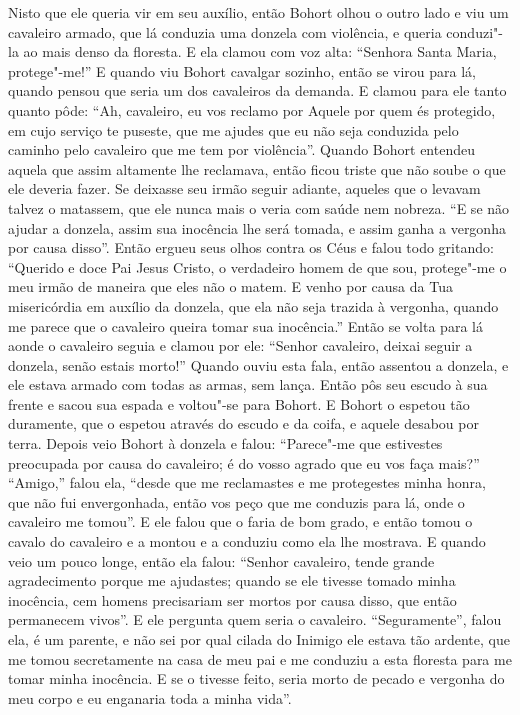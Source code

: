 Nisto que ele queria vir em seu auxílio, então Bohort olhou o outro lado e viu
um cavaleiro armado, que lá conduzia uma donzela com violência, e queria
conduzi"-la ao mais denso da floresta. E ela clamou com voz alta: “Senhora Santa
Maria, protege"-me!” E quando viu Bohort cavalgar sozinho, então se virou para
lá, quando pensou que seria um dos cavaleiros da demanda. E clamou para ele
tanto quanto pôde: “Ah, cavaleiro, eu vos reclamo por Aquele por quem és
protegido, em cujo serviço te puseste, que me ajudes que eu não seja conduzida
pelo caminho pelo cavaleiro que me tem por violência”. Quando Bohort entendeu
aquela que assim altamente lhe reclamava, então ficou triste que não soube o
que ele deveria fazer. Se deixasse seu irmão seguir adiante, aqueles que o
levavam talvez o matassem, que ele nunca mais o veria com saúde nem nobreza. “E
se não ajudar a donzela, assim sua inocência lhe será tomada, e assim ganha a
vergonha por causa disso”. Então ergueu seus olhos contra os Céus e falou todo
gritando: “Querido e doce Pai Jesus Cristo, o verdadeiro homem de que sou,
protege"-me o meu irmão de maneira que eles não o matem. E venho por causa da
Tua misericórdia em auxílio da donzela, que ela não seja trazida à vergonha,
quando me parece que o cavaleiro queira tomar sua inocência.” Então se volta
para lá aonde o cavaleiro seguia e clamou por ele: “Senhor cavaleiro, deixai
seguir a donzela, senão estais morto!” Quando ouviu esta fala, então assentou
a donzela, e ele estava armado com todas as armas, sem lança. Então pôs seu
escudo à sua frente e sacou sua espada e voltou"-se para Bohort. E Bohort o
espetou tão duramente, que o espetou através do escudo e da coifa, e aquele
desabou por terra. Depois veio Bohort à donzela e falou: “Parece"-me que
estivestes preocupada por causa do cavaleiro; é do vosso agrado que eu vos faça
mais?” “Amigo,” falou ela, “desde que me reclamastes e me protegestes minha
honra, que não fui envergonhada, então vos peço que me conduzis para lá, onde o
cavaleiro me tomou”. E ele falou que o faria de bom grado, e então tomou o
cavalo do cavaleiro e a montou e a conduziu como ela lhe mostrava. E quando
veio um pouco longe, então ela falou: “Senhor cavaleiro, tende grande
agradecimento porque me ajudastes; quando se ele tivesse tomado minha
inocência, cem homens precisariam ser mortos por causa disso, que então
permanecem vivos”. E ele pergunta quem seria o cavaleiro. “Seguramente”, falou
ela, é um parente, e não sei por qual cilada do Inimigo ele estava tão ardente,
que me tomou secretamente na casa de meu pai e me conduziu a esta floresta para
me tomar minha inocência. E se o tivesse feito, seria morto de pecado e
vergonha do meu corpo e eu enganaria toda a minha vida”. 

